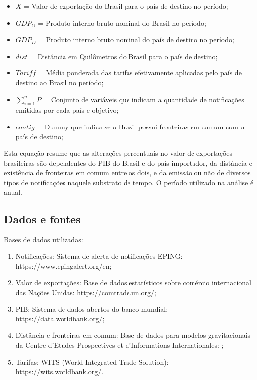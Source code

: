 \documentclass[12pt, a4paper]{article}
\begin{document}
\begin{itemize}
    \item $X$ = Valor de exportação do Brasil para o país de destino no período;
    \item $GDP_{O}$ = Produto interno bruto nominal do Brasil no período;
    \item $GDP_{D}$ = Produto interno bruto nominal do país de destino no período;
    \item $dist$ = Distância em Quilômetros  do Brasil para o país de destino;
    \item $Tariff$ = Média ponderada das tarifas efetivamente aplicadas pelo país de destino ao Brasil no período;
    \item $\sum_{i=1}^{n} P$ = Conjunto de variáveis que indicam a quantidade de notificações emitidas por cada país e objetivo;
    \item $contig$ = Dummy que indica se o Brasil possui fronteiras em comum com o país de destino;
\end{itemize}

Esta equação resume que as alterações percentuais no valor de exportações brasileiras são dependentes do PIB do Brasil e do país importador, da distância e existência de fronteiras em comum entre os dois, e da emissão ou não de diversos tipos de notificações naquele substrato de tempo. O período utilizado na análise é anual.

\subsection{Dados e fontes}

Bases de dados utilizadas:

\begin{enumerate}
    \item Notificações: Sistema de alerta de notificações EPING: https://www.epingalert.org/en;
    \item Valor de exportações: Base de dados estatísticos sobre comércio internacional das Nações Unidas: https://comtrade.un.org/;
    \item PIB: Sistema de dados abertos do banco mundial: https://data.worldbank.org/;
    \item Distância e fronteiras em comum: Base de dados para modelos gravitacionais da Centre d'Etudes Prospectives et d'Informations Internationales: \cite{CEPII};
    \item Tarifas: WITS (World Integrated Trade Solution): https://wits.worldbank.org/.
\end{enumerate}
\end{document}
